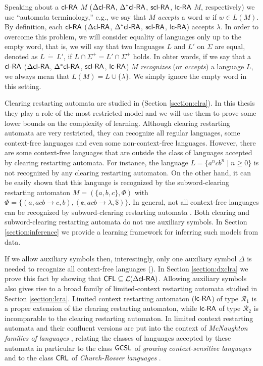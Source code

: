 \begin{remark}\label{remark:lambda}
Speaking about a $\textup{\sf cl-RA\/}$ $M$ ($\textup{\sf $\Delta$cl-RA\/}$, $\textup{\sf $\Delta^*$cl-RA\/}$, $\textup{\sf scl-RA}$, $\lcRA$ $M$, respectively) we use ``automata terminology,'' e.g., we say that $M$ \emph{accepts} a word $w$ if $w \in L(M)$. By definition, each $\textup{\sf cl-RA\/}$ ($\textup{\sf $\Delta$cl-RA\/}$, $\textup{\sf $\Delta^*$cl-RA\/}$, $\textup{\sf scl-RA}$, $\lcRA$) accepts $\lambda$. In order to overcome this problem, we will consider equality of languages only up to the empty word, that is, we will say that two languages $L$ and $L'$ on $\Sigma$ are equal, denoted as $L\, \dot{=}\, L'$, if $L\cap \Sigma^+ = L'\cap\Sigma^+$ holds. In ohter words, if we say that a $\textup{\sf cl-RA\/}$ ($\textup{\sf $\Delta$cl-RA\/}$, $\textup{\sf $\Delta^*$cl-RA\/}$, $\textup{\sf scl-RA}$, $\lcRA$) $M$ \emph{recognizes} (or \emph{accepts}) a language $L$, we always mean that $L(M) = L \cup \{\lambda\}$. We simply ignore the empty word in this setting.
\end{remark}

Clearing restarting automata are studied in \cite{CM10} (Section \ref{section:clra}). In this thesis they play a role of the most restricted model and we will use them to prove some lower bounds on the complexity of learning. Although clearing restarting automata are very restricted, they can recognize all regular languages, some context-free languages and even some non-context-free languages. However, there are some context-free languages that are outside the class of languages accepted by clearing restarting automata. For instance, the language $L = \{a^n c b^n \mid n \ge 0\}$ is not recognized by any clearing restarting automaton. On the other hand, it can be easily shown that this language is recognized by the subword-clearing restarting automaton $M = (\{a, b, c\}, \Phi)$ with $\Phi = \{(a, acb \to c, b), (\cent, acb \to \lambda, \$)\}$. In general, not all context-free languages can be recognized by subword-clearing restarting automata \cite{C13}. Both clearing and subword-clearing restarting automata do not use auxiliary symbols. In Section \ref{section:inference} we provide a learning framework for inferring such models from data.

If we allow auxiliary symbols then, interestingly, only one auxiliary symbol $\Delta$ is needed to recognize all context-free languages (\cite{CM11}). In Section \ref{section:dxclra} we prove this fact by showing that $\textup{\sf CFL} \subseteq {\cal L}(\textup{\sf $\Delta$cl-RA\/})$. Allowing auxiliary symbols also gives rise to a broad family of limited-context restarting automata studied in Section \ref{section:lcra}. Limited context restarting automaton ($\lcRA$) of type $\mathcal{R}_1$ is a proper extension of the clearing restarting automaton, while $\lcRA$ of type $\mathcal{R}_2$ is incomparable to the clearing restarting automaton. In \cite{OCM13} limited context restarting automata and their confluent versions are put into the context of \emph{McNaughton families of languages} \cite{Beaudry2003}, relating the classes of languages accepted by these automata in particular to the class $\textup{\sf GCSL}$ of \emph{growing context-sensitive languages} \cite{Buntrock19981,Dahlhaus1986} and to the class $\textup{\sf CRL}$ of \emph{Church-Rosser languages} \cite{MNO88}.

